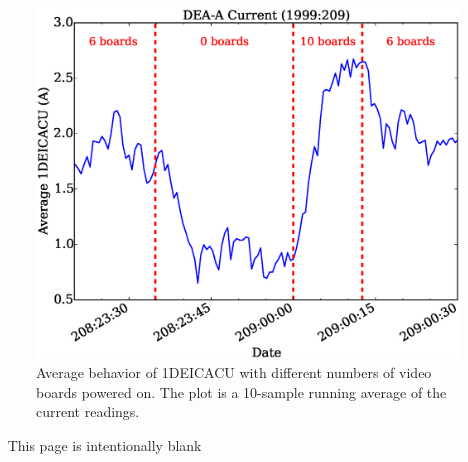 \documentclass[11pt]{article}
\begin{document}
\begin{landscape}
\begin{figure}
\begin{center}
\includegraphics[width=1.2\textwidth]{deaa_on_test_vid_fig3.eps}
\caption{Average behavior of 1DEICACU with different numbers of video boards
powered on. The plot is a 10-sample running average of the current readings.}
\end{center}
\end{figure}
\end{landscape}

\newpage\
\vspace{0.4\textheight}
\bc This page is intentionally blank \ec

\newcommand{\tablecaptiontext}{TURN ON DEA A AND TEST VIDEO BOARDS}

\end{document}
